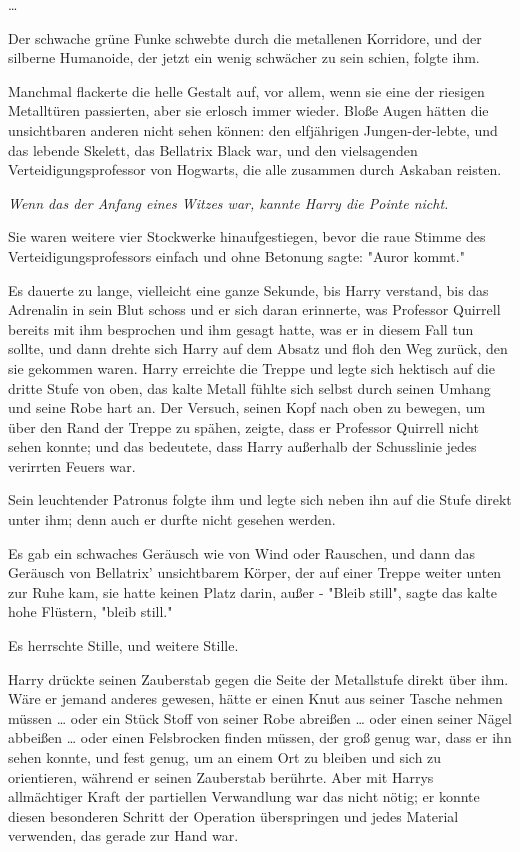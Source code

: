 {…

Der schwache grüne Funke schwebte durch die metallenen Korridore, und der silberne Humanoide, der jetzt ein wenig schwächer zu sein schien, folgte ihm.

Manchmal flackerte die helle Gestalt auf, vor allem, wenn sie eine der riesigen Metalltüren passierten, aber sie erlosch immer wieder. Bloße Augen hätten die unsichtbaren anderen nicht sehen können: den elfjährigen Jungen-der-lebte, und das lebende Skelett, das Bellatrix Black war, und den vielsagenden Verteidigungsprofessor von Hogwarts, die alle zusammen durch Askaban reisten.

\emph{Wenn das der Anfang eines Witzes war, kannte Harry die Pointe nicht.}

Sie waren weitere vier Stockwerke hinaufgestiegen, bevor die raue Stimme des Verteidigungsprofessors einfach und ohne Betonung sagte: "Auror kommt."

Es dauerte zu lange, vielleicht eine ganze Sekunde, bis Harry verstand, bis das Adrenalin in sein Blut schoss und er sich daran erinnerte, was Professor Quirrell bereits mit ihm besprochen und ihm gesagt hatte, was er in diesem Fall tun sollte, und dann drehte sich Harry auf dem Absatz und floh den Weg zurück, den sie gekommen waren. Harry erreichte die Treppe und legte sich hektisch auf die dritte Stufe von oben, das kalte Metall fühlte sich selbst durch seinen Umhang und seine Robe hart an. Der Versuch, seinen Kopf nach oben zu bewegen, um über den Rand der Treppe zu spähen, zeigte, dass er Professor Quirrell nicht sehen konnte; und das bedeutete, dass Harry außerhalb der Schusslinie jedes verirrten Feuers war.

Sein leuchtender Patronus folgte ihm und legte sich neben ihn auf die Stufe direkt unter ihm; denn auch er durfte nicht gesehen werden.

Es gab ein schwaches Geräusch wie von Wind oder Rauschen, und dann das Geräusch von Bellatrix' unsichtbarem Körper, der auf einer Treppe weiter unten zur Ruhe kam, sie hatte keinen Platz darin, außer - "Bleib still", sagte das kalte hohe Flüstern, "bleib still."

Es herrschte Stille, und weitere Stille.

Harry drückte seinen Zauberstab gegen die Seite der Metallstufe direkt über ihm. Wäre er jemand anderes gewesen, hätte er einen Knut aus seiner Tasche nehmen müssen … oder ein Stück Stoff von seiner Robe abreißen … oder einen seiner Nägel abbeißen … oder einen Felsbrocken finden müssen, der groß genug war, dass er ihn sehen konnte, und fest genug, um an einem Ort zu bleiben und sich zu orientieren, während er seinen Zauberstab berührte. Aber mit Harrys allmächtiger Kraft der partiellen Verwandlung war das nicht nötig; er konnte diesen besonderen Schritt der Operation überspringen und jedes Material verwenden, das gerade zur Hand war.

}
